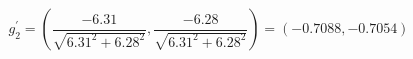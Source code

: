 

\[
g_{2}^{'} = \left( \frac{-6.31}{\sqrt{6.31^2 + 6.28^2}}, \frac{-6.28}{\sqrt{6.31^2 + 6.28^2}} \right) = (-0.7088, -0.7054)
\]


